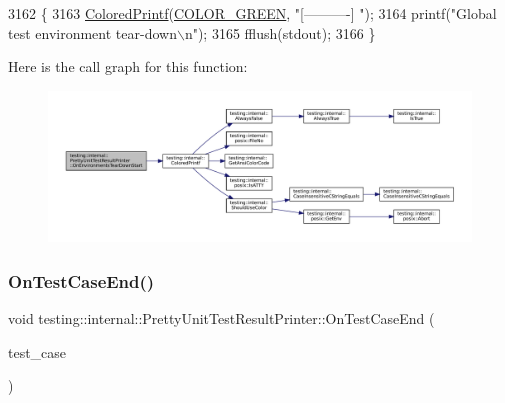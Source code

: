 \begin{DoxyCode}
3162                        \{
3163   \hyperlink{namespacetesting_1_1internal_adef3055706176001364e54eb73a87e31}{ColoredPrintf}(\hyperlink{namespacetesting_1_1internal_a648c1bc94c2ef9e868ff3f9dff0f9c4ea3b1e81f5b14a17b35a8672d57d166507}{COLOR\_GREEN},  \textcolor{stringliteral}{"[----------] "});
3164   printf(\textcolor{stringliteral}{"Global test environment tear-down\(\backslash\)n"});
3165   fflush(stdout);
3166 \}
\end{DoxyCode}
Here is the call graph for this function\+:
\nopagebreak
\begin{figure}[H]
\begin{center}
\leavevmode
\includegraphics[width=350pt]{classtesting_1_1internal_1_1PrettyUnitTestResultPrinter_afea9dc849c92fdbc1d8505f4c74ffc1a_cgraph}
\end{center}
\end{figure}
\mbox{\label{classtesting_1_1internal_1_1PrettyUnitTestResultPrinter_a7a62fe58fa6f6aace813eb62b31e5a51}} 
\subsubsection{\texorpdfstring{On\+Test\+Case\+End()}{OnTestCaseEnd()}}
{\footnotesize\ttfamily void testing\+::internal\+::\+Pretty\+Unit\+Test\+Result\+Printer\+::\+On\+Test\+Case\+End (\begin{DoxyParamCaption}\item[{const \hyperlink{classtesting_1_1TestCase}{Test\+Case} \&}]{test\+\_\+case }\end{DoxyParamCaption})\hspace{0.3cm}{\ttfamily [virtual]}}




